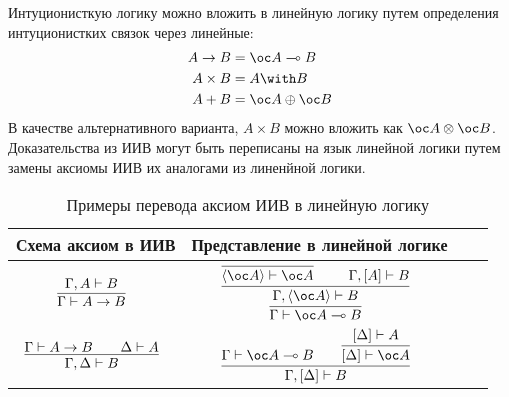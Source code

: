 Интуционисткую логику можно вложить в линейную логику путем определения интуционистких связок через линейные:
\begin{align*}
    A \rightarrow B &= \oc A \multimap B \\
    A \times B      &= A \with B \\
    A + B           &= \oc A \oplus \oc B
\end{align*}
В качестве альтернативного варианта, $A \times B$ можно вложить как $\oc A \otimes \oc B$.
Доказательства из ИИВ могут быть переписаны на язык линейной логики путем замены аксиомы ИИВ их аналогами из линенйной логики.
\begin{table}
\centering
\begin{tabular}{Sc Sc} \toprule
	Схема аксиом в ИИВ & Представление в линейной логике \\ \midrule
	$\infer[]{\Gamma \vdash A \rightarrow B}{\Gamma, A \vdash B}$ &
	$\infer[]{\Gamma \vdash \oc A \multimap B}{
		\infer[]{\Gamma, \pair{\oc A} \vdash B}{
			\infer[]{\pair{\oc A} \vdash \oc A}{} && \Gamma, [A] \vdash B
		}
	}$ \\ \midrule
	$\infer[]{\Gamma, \Delta \vdash B}{\Gamma \vdash A \rightarrow B && \Delta \vdash A}$ &
	$\infer[]{\Gamma, [\Delta] \vdash B}{
		\Gamma \vdash \oc A \multimap B && \infer[]{[\Delta] \vdash \oc A}{[\Delta] \vdash A}
	}$ \\ \bottomrule
\end{tabular}
\caption{Примеры перевода аксиом ИИВ в линейную логику}
\label{intutionistic-axioms-to-linear-samples}
\end{table}
